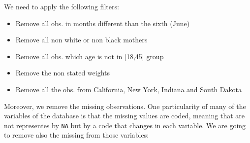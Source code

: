 \documentclass[]{book}
\newenvironment{Shaded}{\begin{snugshade}}{\end{snugshade}}
\newcommand{\KeywordTok}[1]{\textcolor[rgb]{0.13,0.29,0.53}{\textbf{#1}}}
\newcommand{\DecValTok}[1]{\textcolor[rgb]{0.00,0.00,0.81}{#1}}
\newcommand{\StringTok}[1]{\textcolor[rgb]{0.31,0.60,0.02}{#1}}
\newcommand{\OperatorTok}[1]{\textcolor[rgb]{0.81,0.36,0.00}{\textbf{#1}}}
\newcommand{\NormalTok}[1]{#1}
\providecommand{\tightlist}{%
  \setlength{\itemsep}{0pt}\setlength{\parskip}{0pt}}
\begin{document}
We need to apply the following filters:

\begin{itemize}
\tightlist
\item
  Remove all obs. in months different than the sixth (June)
\item
  Remove all non white or non black mothers
\item
  Remove all obs. which age is not in {[}18,45{]} group
\item
  Remove the non stated weights
\item
  Remove all the obs. from California, New York, Indiana and South
  Dakota
\end{itemize}

\begin{Shaded}
\end{Shaded}

Moreover, we remove the missing observations. One particularity of many
of the variables of the database is that the missing values are coded,
meaning that are not representes by
\texttt{\textquotesingle{}NA\textquotesingle{}} but by a code that
changes in each variable. We are going to remove also the missing from
those variables:
\end{document}
